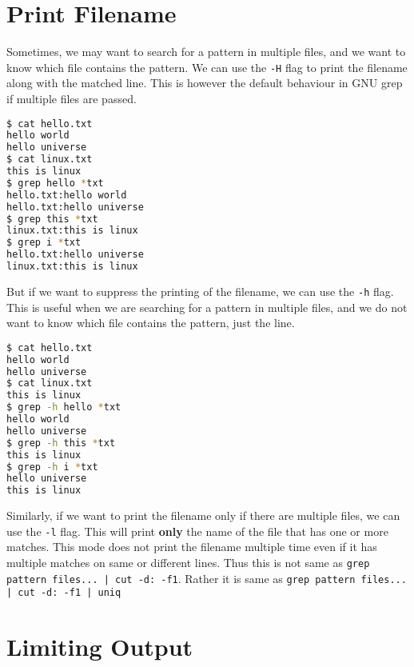 \section{Print Filename}

Sometimes, we may want to search for a pattern in multiple files, and we want to know which file contains the pattern. We can use the \lstinline|-H| flag to print the filename along with the matched line. This is however the default behaviour in GNU grep if multiple files are passed.

\begin{lstlisting}[language=bash]
$ cat hello.txt
hello world
hello universe
$ cat linux.txt
this is linux
$ grep hello *txt
hello.txt:hello world
hello.txt:hello universe
$ grep this *txt
linux.txt:this is linux
$ grep i *txt
hello.txt:hello universe
linux.txt:this is linux
\end{lstlisting}

But if we want to suppress the printing of the filename, we can use the \lstinline|-h| flag. This is useful when we are searching for a pattern in multiple files, and we do not want to know which file contains the pattern, just the line.

\begin{lstlisting}[language=bash]
$ cat hello.txt
hello world
hello universe
$ cat linux.txt
this is linux
$ grep -h hello *txt
hello world
hello universe
$ grep -h this *txt
this is linux
$ grep -h i *txt
hello universe
this is linux
\end{lstlisting}

Similarly, if we want to print the filename only if there are multiple files, we can use the \lstinline|-l| flag. This will print \textbf{only} the name of the file that has one or more matches. This mode does not print the filename multiple time even if it has multiple matches on same or different lines.
Thus this is not same as \lstinline/grep pattern files... | cut -d: -f1/.
Rather it is same as \lstinline/grep pattern files... | cut -d: -f1 | uniq/

\section{Limiting Output}

